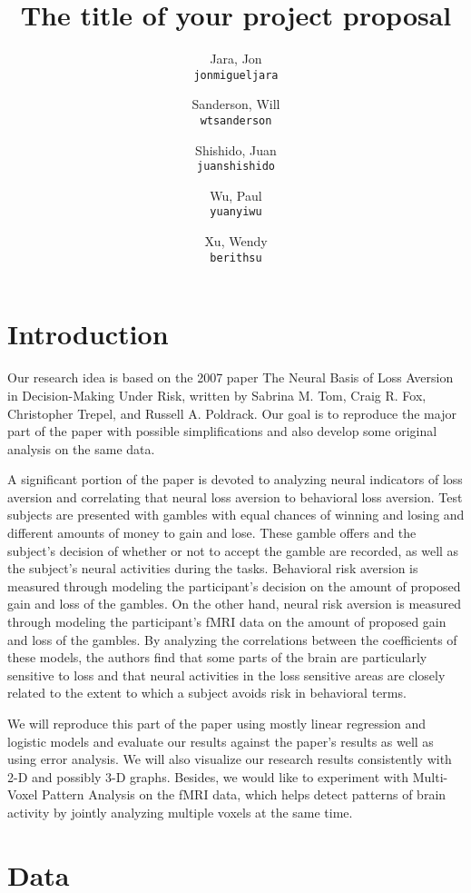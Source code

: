\documentclass[11pt]{article}
\title{The title of your project proposal}
\author{
  Jara, Jon\\
  \texttt{jonmigueljara}
  \and
  Sanderson, Will\\
  \texttt{wtsanderson}
  \and
  Shishido, Juan\\
  \texttt{juanshishido}
  \and
  Wu, Paul\\
  \texttt{yuanyiwu}
  \and
  Xu, Wendy\\
  \texttt{berithsu}
}
\begin{document}
\maketitle


\section{Introduction}

Our research idea is based on the 2007 paper The Neural Basis of
Loss Aversion in Decision-Making Under Risk, written by Sabrina M. Tom, Craig
R. Fox, Christopher Trepel, and Russell A. Poldrack\cite{tom}. Our goal is to
reproduce the major part of the paper with possible simplifications and also
develop some original analysis on the same data.

A significant portion of the paper is devoted to analyzing neural
indicators of loss aversion and correlating that neural loss aversion to
behavioral loss aversion. Test subjects are presented with gambles with equal
chances of winning and losing and different amounts of money to gain and lose.
These gamble offers and the subject’s decision of whether or not to accept the
gamble are recorded, as well as the subject’s neural activities during the
tasks. Behavioral risk aversion is measured through modeling the participant’s
decision on the amount of proposed gain and loss of the gambles. On the other
hand, neural risk aversion is measured through modeling the participant’s fMRI
data on the amount of proposed gain and loss of the gambles. By analyzing the
correlations between the coefficients of these models, the authors find that
some parts of the brain are particularly sensitive to loss and that neural
activities in the loss sensitive areas are closely related to the extent to
which a subject avoids risk in behavioral terms.

We will reproduce this part of the paper using mostly linear regression and
logistic models and evaluate our results against the paper’s results as well as
using error analysis. We will also visualize our research results consistently
with 2-D and possibly 3-D graphs. Besides, we would like to experiment with
Multi-Voxel Pattern Analysis on the fMRI data, which helps detect patterns of
brain activity by jointly analyzing multiple voxels at the same time. 

\section{Data}
\end{document}
